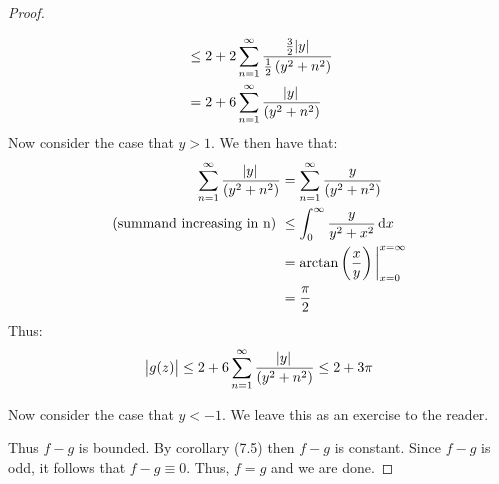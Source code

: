 \begin{proof}
\begin{enumerate}
\begin{align*}
        &\leq 2 + 2 \sum_{n=1}^\infty \frac{\frac{3}{2}\abs{y}}{\frac{1}{2} \left( y^2 + n^2 \right)}\\
        &= 2 + 6 \sum_{n=1}^\infty \frac{\abs{y}}{ \left( y^2 + n^2 \right)}
    \end{align*}
Now consider the case that $y>1$. We then have that:
\begin{align*}
    \sum_{n=1}^\infty \frac{\abs{y}}{ \br{y^2 + n^2}} &= \sum_{n=1}^\infty \frac{y}{ \br{y^2 + n^2}}\\
    \text{(summand increasing in n) }&\leq \int_{0}^\infty \frac{y}{y^2+x^2} \dif x\\
    &= \arctan\br{\frac{x}{y}}\bigg|_{x=0}^{x= \infty}\\ &= \frac{\pi}{2}
\end{align*}
Thus:
\begin{align*}
    \abs{g(z)} \leq 2 + 6 \sum_{n=1}^\infty \frac{\abs{y}}{ \left( y^2 + n^2 \right)} \leq 2 + 3 \pi
\end{align*}

Now consider the case that $y<-1$. We leave this as an exercise to the reader.
\end{enumerate}

Thus $f-g$ is bounded. By corollary (7.5) then $f-g$ is constant. Since $f-g$ is odd, it follows that $f-g \equiv 0$. Thus, $f=g$ and we are done.



\end{proof}








